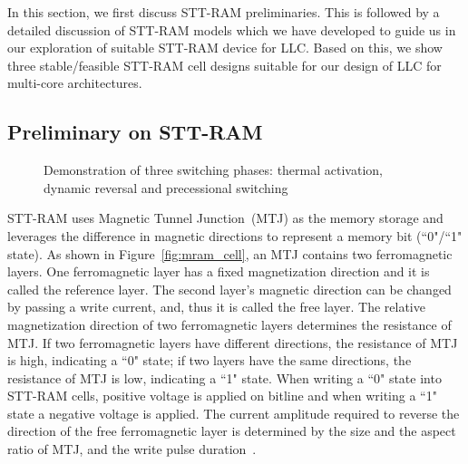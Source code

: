 In this section, we first discuss STT-RAM preliminaries. This is followed by a detailed discussion of
STT-RAM models which we have developed to guide us in our exploration of suitable STT-RAM device for
LLC. Based on this, we show three stable/feasible STT-RAM cell designs
suitable for our design of LLC for multi-core architectures.

\subsection{Preliminary on STT-RAM}


\begin{figure*} [t]
\centering
\begin{minipage}{0.575\textwidth}
\centering
 \caption{\label{fig:mram_cell} (a) Structural view of an STT-RAM Cache Cell
 (b) Anti Space Parallel High Resistance, Indicating ``0" state (c) Parallel Low Resistance, Indicating ``1" state}
\end{minipage}
\hfill
\begin{minipage}{0.375\textwidth}
\centering
 \caption{\label{fig:IcWt} Demonstration of three switching phases:
 thermal activation, dynamic reversal and precessional switching }
\end{minipage}
\end{figure*}

STT-RAM uses Magnetic Tunnel Junction~(MTJ) as the memory storage and leverages the difference in
magnetic directions to represent a memory bit (``0"/``1" state). As shown in
Figure~\ref{fig:mram_cell}, an MTJ contains two ferromagnetic layers. One ferromagnetic layer has a
fixed magnetization direction and it is called the reference layer. The second layer's magnetic
direction can be changed by passing a write current, and, thus it is called the free layer. The
relative magnetization direction of two ferromagnetic layers determines the resistance of MTJ.  If
two ferromagnetic layers have different directions, the resistance of MTJ is high, indicating a ``0"
state; if two layers have the same directions, the resistance of MTJ is low, indicating a ``1"
state. When writing a ``0" state into STT-RAM cells, positive voltage is applied on bitline and when
writing a ``1" state a negative voltage is applied. The current amplitude required to reverse the
direction of the free ferromagnetic layer is determined by the size and the aspect ratio of MTJ, and
the write pulse duration~\cite{STTRAM:JAP07, STTRAM:Qualcomm09}.

